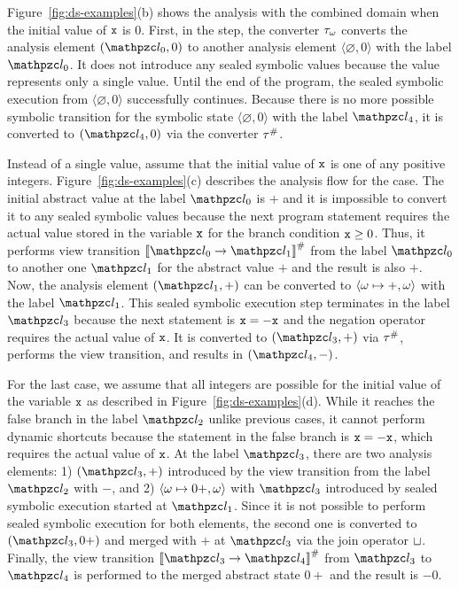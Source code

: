 Figure~\ref{fig:ds-examples}(b) shows the analysis with the combined domain when
the initial value of $\texttt{x}$ is $0$.  First, in the  step,
the converter ${\tau}_\omega$ converts the analysis element $(\lab_0, 0)$ to
another analysis element $\langle \varnothing, 0 \rangle$ with the label
$\lab_0$.  It does not introduce any sealed symbolic values because
the value represents only a single value.  Until the end of the program, the
sealed symbolic execution from $\langle \varnothing, 0 \rangle$ successfully
continues.  Because there is no more possible symbolic transition for the
symbolic state $\langle \varnothing, 0 \rangle$ with the label $\lab_4$,
it is converted to $(\lab_4, 0)$ via the converter ${\tau}^{\#}$.

Instead of a single value, assume that the initial value of $\texttt{x}$ is one of
any positive integers.  Figure~\ref{fig:ds-examples}(c) describes the analysis
flow for the case.  The initial abstract value at the label $\lab_0$ is
$+$ and it is impossible to convert it to any sealed symbolic values because the
next program statement requires the actual value stored in the variable $\texttt{x}$
for the branch condition $\texttt{x} \geq 0$.  Thus, it performs view transition
$\viewtrans{\lab_0}{\lab_1}$ from the label $\lab_0$ to another one $\lab_1$ for
the abstract value $+$ and the result is also $+$.  Now, the analysis element
$(\lab_1, +)$ can be converted to $\langle \omega \mapsto +, \omega \rangle$
with the label $\lab_1$.  This sealed symbolic execution step terminates in the
label $\lab_3$ because the next statement is $\texttt{x} = -\texttt{x}$ and the negation
operator requires the actual value of $\texttt{x}$.  It is converted to $(\lab_3, +)$ via ${\tau}^{\#}$,
performs the view transition, and results in $(\lab_4, -)$.

For the last case, we assume that all integers are possible for the initial
value of the variable $\texttt{x}$ as described in Figure~\ref{fig:ds-examples}(d).
While it reaches the false branch in the label $\lab_2$ unlike previous cases,
it cannot perform dynamic shortcuts because the statement in the false
branch is $\texttt{x} = -\texttt{x}$, which requires the actual value of $\texttt{x}$.
At the label $\lab_3$, there are two analysis
elements: 1) $(\lab_3, +)$ introduced by the view transition from the label $\lab_2$
with $-$, and 2) $\langle \omega \mapsto 0+, \omega \rangle$ with $\lab_3$
introduced by sealed symbolic execution started at $\lab_1$.  Since it
is not possible to perform sealed symbolic execution for both elements, the
second one is converted to $(\lab_3, 0+)$ and merged with $+$ at $\lab_3$ via the
join operator $\sqcup$.  Finally, the view transition
$\viewtrans{\lab_3}{\lab_4}$ from $\lab_3$ to $\lab_4$ is performed to the
merged abstract state $0+$ and the result is $-0$.

